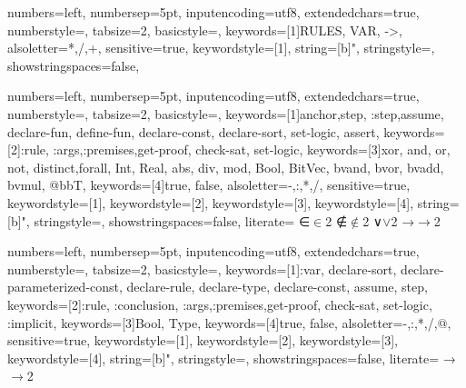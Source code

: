 

\lstset{style=mystyle}

{
  numbers=left,
  numbersep=5pt,
  inputencoding=utf8,
  extendedchars=true,
  numberstyle=\footnotesize,
  tabsize=2,
  basicstyle={\ttfamily\scriptsize\upshape},
  keywords=[1]{RULES, VAR, ->},
  alsoletter={*,/,+},
  sensitive=true,
  keywordstyle={[1]\bfseries\color{Emerald}},
  string=[b]{"},
  stringstyle=\color{RedOrange},
  showstringspaces=false,
}

{
  numbers=left,
  numbersep=5pt,
  inputencoding=utf8,
  extendedchars=true,
  numberstyle=\footnotesize,
  tabsize=2,
  basicstyle={\ttfamily\scriptsize\upshape},
  keywords=[1]{anchor,step, :step,assume, declare-fun, define-fun, declare-const, declare-sort, set-logic, assert},
  keywords=[2]{:rule, :args,:premises,get-proof, check-sat, set-logic},
  keywords=[3]{xor, and, or, not, distinct,forall, Int, Real, abs, div, mod, Bool, BitVec, bvand, bvor, bvadd, bvmul, @bbT},
  keywords=[4]{true, false},
  alsoletter={-,:,*,/},
  sensitive=true,
  keywordstyle={[1]\bfseries\color{mylpurple}},
  keywordstyle={[2]\bfseries\color{RoyalBlue}},
  keywordstyle={[3]\bfseries\color{mypurple}},
  keywordstyle={[4]\bfseries\color{Emerald}},
  string=[b]{"},
  stringstyle=\color{RedOrange},
  showstringspaces=false,
  literate=
  {∈}{$\in$}2
  {∉}{$\notin$}2
  {∨}{$\lor$}2
  {→}{$\rightarrow$}2
}

{
  numbers=left,
  numbersep=5pt,
  inputencoding=utf8,
  extendedchars=true,
  numberstyle=\footnotesize,
  tabsize=2,
  basicstyle={\ttfamily\scriptsize\upshape},
  keywords=[1]{:var, declare-sort, declare-parameterized-const, declare-rule, declare-type, declare-const, assume, step},
  keywords=[2]{:rule, :conclusion, :args,:premises,get-proof, check-sat, set-logic, :implicit},
  keywords=[3]{Bool, Type},
  keywords=[4]{true, false},
  alsoletter={-,:,*,/,@},
  sensitive=true,
  keywordstyle={[1]\bfseries\color{mylpurple}},
  keywordstyle={[2]\bfseries\color{RoyalBlue}},
  keywordstyle={[3]\bfseries\color{mypurple}},
  keywordstyle={[4]\bfseries\color{Emerald}},
  string=[b]{"},
  stringstyle=\color{RedOrange},
  showstringspaces=false,
  literate=
  {→}{$\rightarrow$}2
}

